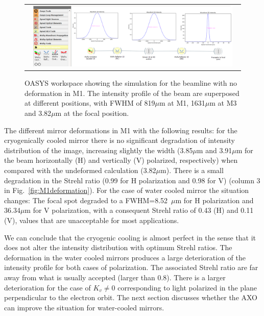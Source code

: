 \documentclass{iucr}              %
\begin{document}
\begin{figure} 
\label{fig:nodeformation} 
\begin{center}
\begin{tabular}{c} 
\includegraphics[width=0.95\textwidth]{figures/wofrynodeformation.png}

\end{tabular}
\end{center}
\caption
{ 
OASYS workspace showing the simulation for the beamline with no deformation in M1. The intensity profile of the beam are superposed at different positions, with FWHM of 819$\mu$m at M1, 1631$\mu$m at M3 and 3.82$\mu$m at the focal position.  }
\end{figure} 

The different mirror deformations in M1 with the following results: for the cryogenically cooled mirror there is no significant degradation of intensity distribution of the image, increasing slightly the width (3.85$\mu$m and 3.91$\mu$m for the beam horizontally (H) and vertically (V) polarized, respectively) when compared with the undeformed calculation (3.82$\mu$m). There is a small degradation in the Strehl ratio (0.99 for H polarization and 0.98 for V) (column 3 in Fig.~\ref{fig:M1deformation}). For the case of water cooled mirror the situation changes: The focal spot degraded to a FWHM=8.52~$\mu$m for H polarization and 36.34$\mu$m for V polarization, with a consequent Strehl ratio of 0.43 (H) and 0.11 (V), values that are unacceptable for most applications. 

We can conclude that the cryogenic cooling is almost perfect in the sense that it does not alter the intensity distribution with optimum Strehl ratios. The deformation in the water cooled mirrors produces a large deterioration of the intensity profile for both cases of polarization. The associated Strehl ratio are far away from what is usually accepted (larger than 0.8). There is a larger deterioration for the case of $K_v\ne 0$ corresponding to light polarized in the plane perpendicular to the electron orbit. The next section discusses whether the AXO can improve the situation for water-cooled mirrors.    
\end{document}
